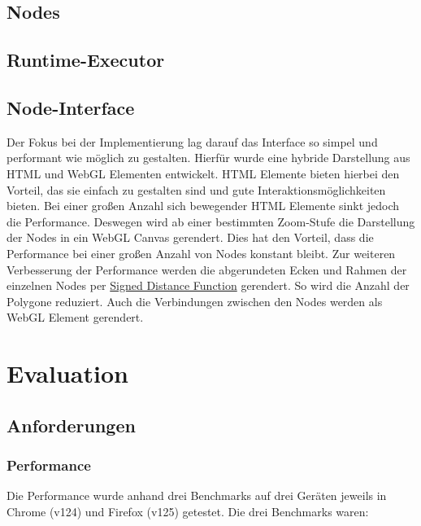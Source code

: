 \documentclass[ngerman]{article}
\begin{document}
\subsection{Nodes}

\subsection{Runtime-Executor}

\subsection{Node-Interface}
Der Fokus bei der Implementierung lag darauf das Interface so simpel und performant wie möglich zu gestalten. Hierfür wurde eine hybride Darstellung aus HTML und WebGL Elementen entwickelt. HTML Elemente bieten hierbei den Vorteil, das sie einfach zu gestalten sind und gute Interaktionsmöglichkeiten bieten. Bei einer großen Anzahl sich bewegender HTML Elemente sinkt jedoch die Performance. 
Deswegen wird ab einer bestimmten Zoom-Stufe die Darstellung der Nodes in ein WebGL Canvas gerendert. Dies hat den Vorteil, dass die Performance bei einer großen Anzahl von Nodes konstant bleibt. 
Zur weiteren Verbesserung der Performance werden die abgerundeten Ecken und Rahmen der einzelnen Nodes per \href{https://en.wikipedia.org/wiki/Signed_distance_function}{Signed Distance Function} gerendert. So wird die Anzahl der Polygone reduziert. Auch die Verbindungen zwischen den Nodes werden als WebGL Element gerendert.

\pagebreak


\section{Evaluation}

\subsection{Anforderungen}

\subsubsection{Performance}

Die Performance wurde anhand drei Benchmarks auf drei Geräten jeweils in Chrome (v124) und Firefox (v125) getestet. Die drei Benchmarks waren:
\end{document}
